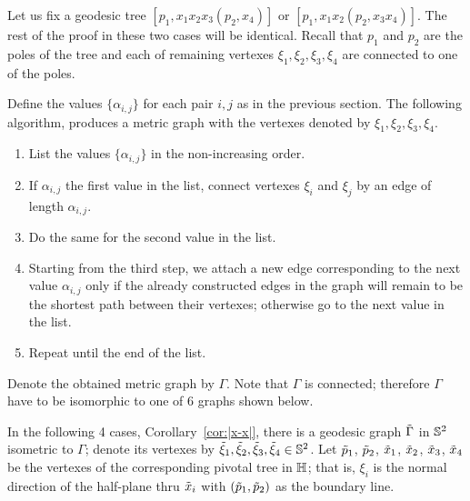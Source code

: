 Let us fix a geodesic tree $[p_1,x_1x_2x_3(p_2,x_4)]$ or $[p_1,x_1x_2(p_2,x_3x_4)]$.
The rest of the proof in these two cases will be identical.
Recall that $p_1$ and $p_2$ are the poles of the tree and each of remaining vertexes $\xi_1,\xi_2, \xi_3,\xi_4$ are connected to one of the poles.

Define the values $\{\alpha_{i,j}\}$ for each pair $i,j$ as in the previous section.
The following algorithm, produces a metric graph with the vertexes denoted by $\xi_1,\xi_2, \xi_3,\xi_4$.
\begin{enumerate}[1.]
\item List the values $\{\alpha_{i,j}\}$ in the non-increasing order.
\item If $\alpha_{i,j}$ the first value in the list, connect vertexes $\xi_i$ and $\xi_j$ by an edge of length $\alpha_{i,j}$.
\item Do the same for the second value  in the list.
\item Starting from the third step, we attach a new edge corresponding to the next value $\alpha_{i,j}$ only if the already constructed edges in the graph will remain to be the shortest path between their vertexes; otherwise go to the next value in the list. 
\item Repeat until the end of the list.
\end{enumerate}
Denote the obtained metric graph by $\Gamma$.
Note that $\Gamma$ is connected;
therefore $\Gamma$ have to be isomorphic to one of 6 graphs shown below.

In the following 4 cases, Corollary~\ref{cor:|x-x|}, there is a geodesic graph $\~\Gamma$ in $\SS^2$ isometric to $\Gamma$;
denote its vertexes by $\~\xi_1,\~\xi_2,\~\xi_3,\~\xi_4\in \SS^2$.
Let $\~p_1$, $\~p_2$, $\~x_1$, $\~x_2$, $\~x_3$, $\~x_4$ be the vertexes of the corresponding pivotal tree in $\HH$;
that is, $\xi_i$ is the normal direction of the half-plane thru $\~x_i$ with $(\~p_1,\~p_2)$ as the boundary line.

